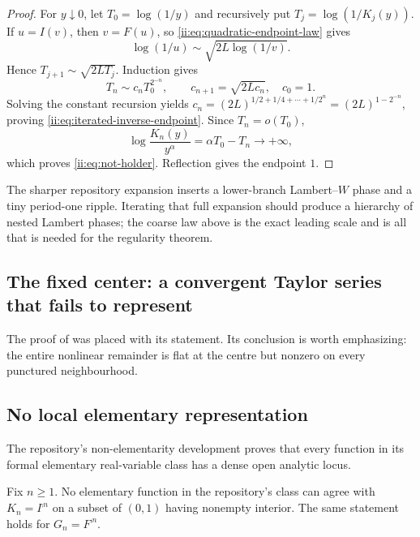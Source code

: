 \begin{proof}
For $y\downarrow0$, let $T_0=\log(1/y)$ and recursively put
$T_j=\log(1/K_j(y))$.  If $u=I(v)$, then $v=F(u)$, so
\eqref{ii:eq:quadratic-endpoint-law} gives
\begin{equation}
 \log(1/u)\sim\sqrt{2L\log(1/v)}.
 \label{ii:eq:one-inverse-log}
\end{equation}
Hence $T_{j+1}\sim\sqrt{2LT_j}$.  Induction gives
\[
 T_n\sim c_n T_0^{2^{-n}},
 \qquad c_{n+1}=\sqrt{2Lc_n},\quad c_0=1.
\]
Solving the constant recursion yields
$c_n=(2L)^{1/2+1/4+\cdots+1/2^n}=(2L)^{1-2^{-n}}$, proving
\eqref{ii:eq:iterated-inverse-endpoint}.  Since $T_n=o(T_0)$,
\[
 \log\frac{K_n(y)}{y^\alpha}=\alpha T_0-T_n\longrightarrow+\infty,
\]
which proves \eqref{ii:eq:not-holder}.  Reflection gives the endpoint $1$.
\end{proof}

The sharper repository expansion inserts a lower-branch Lambert--$W$ phase and a tiny
period-one ripple.  Iterating that full expansion should produce a hierarchy of nested
Lambert phases; the coarse law above is the exact leading scale and is all that is
needed for the regularity theorem.

\subsection{The fixed center: a convergent Taylor series that fails to represent}

The proof of  was placed with its statement.  Its
conclusion is worth emphasizing: the entire nonlinear remainder is flat at
the centre but nonzero on every punctured neighbourhood.

\subsection{No local elementary representation}

The repository's non-elementarity development proves that every function in its
formal elementary real-variable class has a dense open analytic locus.

\begin{corollary}
\label{ii:cor:non-elementary}
Fix $n\geq1$.  No elementary function in the repository's class can agree with
$K_n=I^{\comp n}$ on a subset of $(0,1)$ having nonempty interior.  The same statement
holds for $G_n=F^{\comp n}$.
\end{corollary}

